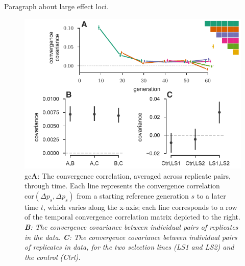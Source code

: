 \documentclass[11pt]{article}
\newcommand{\gc}[1]{{\it \color{red} #1 } }
\begin{document}
Paragraph about large effect loci.

\begin{figure}[!ht]
  \centering
  \includegraphics[width=\textwidth]{figures/figure-2.pdf}

  \caption{gc{{\bf A}}: The convergence correlation, averaged across replicate pairs,
    through time. Each line represents the convergence correlation
    $\mathrm{cor}(\Delta p_{s}, \Delta p_{s})$ from a starting reference
    generation $s$ to a later time $t$, which varies along the x-axis; each
  line corresponds to a row of the temporal convergence correlation matrix
depicted to the right.  \gc{{\bf B}: The convergence covariance between
individual pairs of replicates in the \textcite{Kelly2019-dc} data. {\bf C}:  The convergence covariance between
individual pairs of replicates in \parencite{Castro2019-uk} data, for
the two selection lines  (LS1 and LS2) and the control (Ctrl).}}

  \label{fig:figure-2}
\end{figure}
\end{document}
